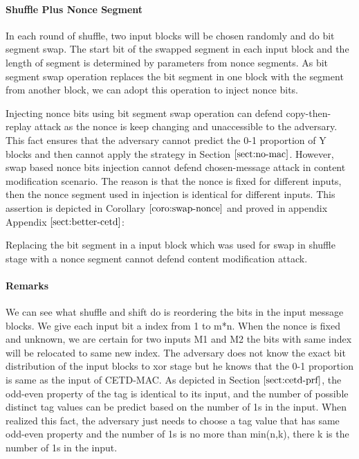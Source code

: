  \paragraph{Shuffle Plus Nonce Segment}
In each round of shuffle, two input blocks will be chosen randomly and do bit segment swap. The start bit of the swapped segment in each input block and the length of segment is determined by parameters from nonce segments. As bit segment swap operation replaces the bit segment in one block with the segment from another block, we can adopt this operation to inject nonce bits.

Injecting nonce bits using bit segment swap operation can defend copy-then-replay attack as the nonce is keep changing and unaccessible to the adversary. This fact ensures that the adversary cannot predict the 0-1 proportion of Y blocks and then cannot apply the strategy in Section $\ref{sect:no-mac}$. 
However, swap based nonce bits injection cannot defend chosen-message attack in content modification scenario. The reason is that the nonce is fixed for different inputs, then the nonce segment used in injection is identical for different inputs. This assertion is depicted in Corollary $\ref{coro:swap-nonce}$ and proved in appendix Appendix $\ref{sect:better-cetd}$:
\begin{corollary}\label{coro:swap-nonce}
Replacing the bit segment in a input block which was used for swap in shuffle stage with a nonce segment cannot defend content modification attack.
\end{corollary}

\paragraph{Remarks}
\label{par:diffusion}
We can see what shuffle and shift do is reordering the bits in the input message
blocks. We give each input bit a index from 1 to m*n. When the nonce is fixed
and unknown, we are certain for two inputs M1 and M2 the bits with same index
will be relocated to same new index. The adversary does not know the exact bit
distribution of the input blocks to xor stage but he knows that the 0-1
proportion is same as the input of CETD-MAC. As depicted in Section $\ref{sect:cetd-prf}$, the odd-even property of the tag is identical to its input, and the number of possible distinct tag values can be predict based on the number of 1s in the input. When realized this fact, the adversary just needs to choose a tag value that has same odd-even property and the number of 1s is no more than min(n,k), there k is the number of 1s in the input.

